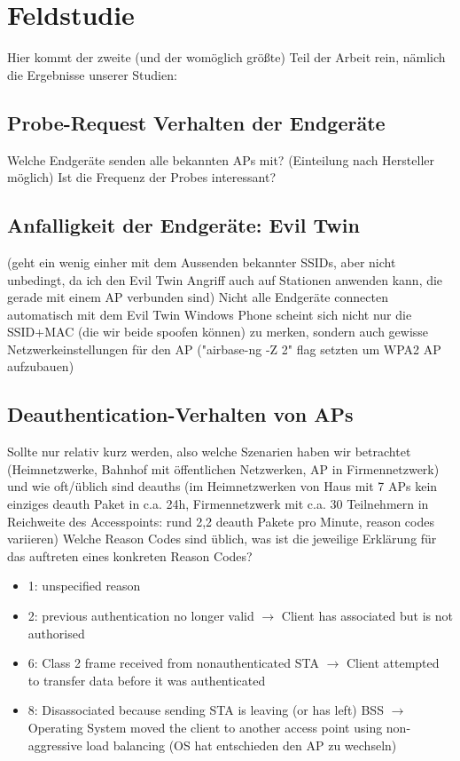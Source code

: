 \section{Feldstudie}
Hier kommt der zweite (und der womöglich größte) Teil der Arbeit rein, nämlich die Ergebnisse unserer Studien:

\subsection{Probe-Request Verhalten der Endgeräte}
Welche Endgeräte senden alle bekannten APs mit? (Einteilung nach Hersteller möglich)  
Ist die Frequenz der Probes interessant?

\subsection{Anfalligkeit der Endgeräte: Evil Twin}
(geht ein wenig einher mit dem Aussenden bekannter SSIDs, aber nicht unbedingt, da ich den Evil Twin Angriff auch auf Stationen anwenden kann, die gerade mit einem AP verbunden sind)
Nicht alle Endgeräte connecten automatisch mit dem Evil Twin
Windows Phone scheint sich nicht nur die SSID+MAC (die wir beide spoofen können) zu merken, sondern auch gewisse Netzwerkeinstellungen für den AP ("airbase-ng -Z 2" flag setzten um WPA2 AP aufzubauen)

\subsection{Deauthentication-Verhalten von APs}
Sollte nur relativ kurz werden, also welche Szenarien haben wir betrachtet (Heimnetzwerke, Bahnhof mit öffentlichen Netzwerken, AP in Firmennetzwerk) und wie oft/üblich sind deauths (im Heimnetzwerken von Haus mit 7 APs kein einziges deauth Paket in c.a. 24h, Firmennetzwerk mit c.a. 30 Teilnehmern in Reichweite des Accesspoints: rund 2,2 deauth Pakete pro Minute, reason codes variieren)
Welche Reason Codes sind üblich, was ist die jeweilige Erklärung für das auftreten eines konkreten Reason Codes?
\begin{itemize}
	\item 1: unspecified reason 
    \item 2: previous authentication no longer valid $\rightarrow$ Client has associated but is not authorised
    \item 6: Class 2 frame received from nonauthenticated STA $\rightarrow$ Client attempted to transfer data before it was authenticated
   	\item 8: Disassociated because sending STA is leaving (or has left) BSS $\rightarrow$ Operating System moved the client to another access point using non-aggressive load balancing (OS hat entschieden den AP zu wechseln)  
\end{itemize}